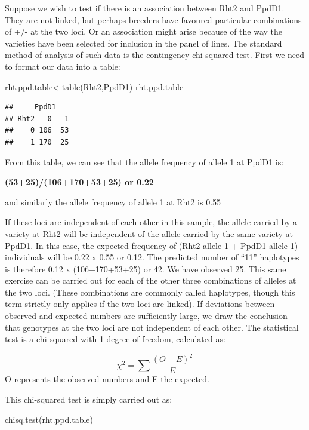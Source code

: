 \documentclass[
]{book}
\newenvironment{Shaded}{\begin{snugshade}}{\end{snugshade}}
\newcommand{\FunctionTok}[1]{\textcolor[rgb]{0.00,0.00,0.00}{#1}}
\newcommand{\NormalTok}[1]{#1}
\newcommand{\OtherTok}[1]{\textcolor[rgb]{0.56,0.35,0.01}{#1}}
\begin{document}
Suppose we wish to test if there is an association between Rht2 and PpdD1. They are not linked, but perhaps breeders have favoured particular combinations of +/- at the two loci. Or an association might arise because of the way the varieties have been selected for inclusion in the panel of lines. The standard method of analysis of such data is the contingency chi-squared test.
First we need to format our data into a table:

\begin{Shaded}
\begin{Highlighting}[]
\NormalTok{rht.ppd.table}\OtherTok{\textless{}{-}}\FunctionTok{table}\NormalTok{(Rht2,PpdD1) }
\NormalTok{rht.ppd.table}
\end{Highlighting}
\end{Shaded}

\begin{verbatim}
##     PpdD1
## Rht2   0   1
##    0 106  53
##    1 170  25
\end{verbatim}

From this table, we can see that the allele frequency of allele 1 at PpdD1 is:

\textbf{(53+25)/(106+170+53+25) or 0.22}

and similarly the allele frequency of allele 1 at Rht2 is 0.55

If these loci are independent of each other in this sample, the allele carried by a variety at Rht2 will be independent of the allele carried by the same variety at PpdD1. In this case, the expected frequency of (Rht2 allele 1 + PpdD1 allele 1) individuals will be 0.22 x 0.55 or 0.12. The predicted number of ``11'' haplotypes is therefore 0.12 x (106+170+53+25) or 42. We have observed 25. This same exercise can be carried out for each of the other three combinations of alleles at the two loci. (These combinations are commonly called haplotypes, though this term strictly only applies if the two loci are linked). If deviations between observed and expected numbers are sufficiently large, we draw the conclusion that genotypes at the two loci are not independent of each other. The statistical test is a chi-squared with 1 degree of freedom, calculated as:

\[\chi^2 = \sum \frac {(O - E)^2}{E}\]
O represents the observed numbers and E the expected.

This chi-squared test is simply carried out as:

\begin{Shaded}
\begin{Highlighting}[]
\FunctionTok{chisq.test}\NormalTok{(rht.ppd.table)}
\end{Highlighting}
\end{Shaded}
\end{document}
